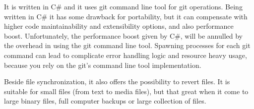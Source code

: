         It is written in C\# and it uses git command line tool for git operations. Being written in C\# it has some drawback for portability, but it can compensate with higher code maintainability and extensibility options, and also performance boost. Unfortunately, the performance boost given by C\#, will be annulled by the overhead in using the git command line tool. Spawning processes for each git command can lead to complicate error handling logic and resource heavy usage, because you rely on the git's command line tool implementation.

        Beside file synchronization, it also offers the possibility to revert files. It is suitable for small files (from text to media files), but that great when it come to large binary files, full computer backups or large collection of files.
